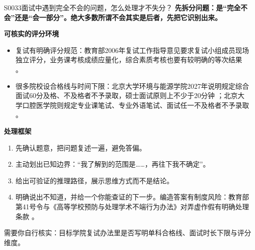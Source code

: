 \begin{qa}{S0033}{面试中遇到完全不会的问题，怎么处理才不失分？}
\textbf{先拆分问题：是“完全不会”还是“会一部分”。绝大多数所谓不会其实是后者，先把它识别出来。}

\textbf{可核实的评分环境}
\begin{itemize}
  \item 复试有明确评分规范：教育部2006年复试工作指导意见要求复试小组成员现场独立评分，业务课考核成绩应量化，综合素质考核也要有较明确的等次结果 。
  \item 很多院校设合格线与时间下限：北京大学环境与能源学院2027年说明规定综合面试60分及格、不及格者不予录取，硕士面试原则上不少于20分钟 ；北京大学口腔医学院则规定专业课笔试、专业外语笔试、面试任一不及格者不予录取 。
\end{itemize}

\textbf{处理框架}
\begin{enumerate}
  \item 先确认题意，把问题复述一遍，避免答偏。
  \item 主动划出已知边界：“我了解到的范围是……，再往下我不确定”。
  \item 给出可验证的推理路径，展示思维方式而不是结论。
  \item 明确说出不知道，并给一个你能查证的下一步。编造答案有制度风险：教育部第41号令与《高等学校预防与处理学术不端行为办法》对弄虚作假有明确处理条款 。
\end{enumerate}

需要你自行核实：目标学院复试办法里是否写明单科合格线、面试时长下限与评分维度。
\end{qa}

